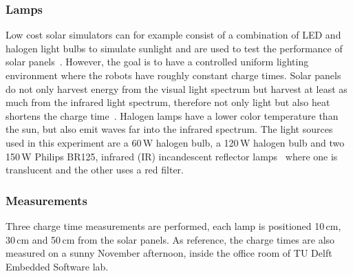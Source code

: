 \begin{table}[t]
	\centering
	\caption{Specification of the three solar panels tested in the experiment.}
	\label{tab:solar_panels}
\end{table}


\subsubsection{Lamps}
Low cost solar simulators can for example consist of a combination of LED and halogen light bulbs to simulate sunlight and are used to test the performance of solar panels~\cite{grandi_tia_2014}.
However, the goal is to have a controlled uniform lighting environment where the robots have roughly constant charge times.
Solar panels do not only harvest energy from the visual light spectrum but harvest at least as much from the infrared light spectrum, therefore not only light but also heat shortens the charge time~\cite{ixolar_slmd121h04l_2017}.
Halogen lamps have a lower color temperature than the sun, but also emit waves far into the infrared spectrum.
The light sources used in this experiment are a 60\,W halogen bulb, a 120\,W halogen bulb and two 150\,W Philips  BR125, infrared (IR) incandescent reflector lamps~\cite{philips_irlamp_2017} where one is translucent and the other uses a red filter.

\subsubsection{Measurements}
Three charge time measurements are performed, each lamp is positioned 10\,cm, 30\,cm and 50\,cm from the solar panels.
As reference, the charge times are also measured on a sunny November afternoon, inside the office room of TU Delft Embedded Software lab. 

